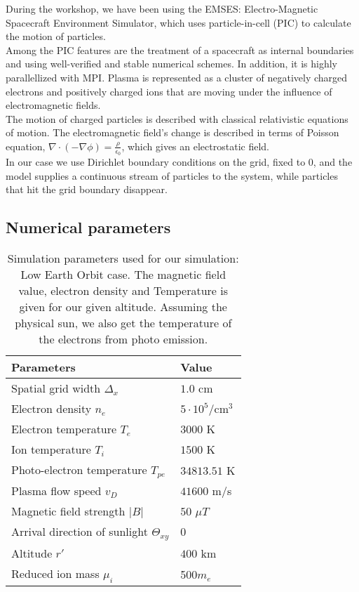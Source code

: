 \documentclass[aip, 
rsi, 
amsmath,
amssymb,
longbibliography,
preprint]{revtex4-1}
\begin{document}
During the workshop, we have been using the EMSES: Electro-Magnetic Spacecraft Environment Simulator, which uses particle-in-cell (PIC) to calculate the motion of particles.\\

Among the PIC features are the treatment of a spacecraft as internal boundaries and using well-verified and stable numerical schemes. In addition, it is highly parallellized with MPI. Plasma is represented as a cluster\cite{numsetup} of negatively charged electrons and positively charged ions that are moving under the influence of electromagnetic fields.\\

The motion of charged particles is described with classical relativistic equations of motion. The electromagnetic field’s change is described in terms of Poisson equation, $\nabla\cdot(-\nabla \phi)=\frac{\rho}{\epsilon_0}$, which gives an electrostatic field\cite{numsetup2}.\\

In our case we use Dirichlet boundary conditions on the grid, fixed to 0, and the model supplies a continuous stream of particles to the system, while particles that hit the grid boundary disappear.

\subsection{Numerical parameters}

\begin{table}
  \centering
  \caption{Simulation parameters used for our simulation: Low Earth Orbit case. The magnetic field value, electron density and Temperature is given for our given altitude. Assuming the physical sun, we also get the temperature of the electrons from photo emission.\label{tab:table1}}
\begin{tabular}{|l|l|}
\hline
\hline
  Parameters & Value  \\
  \hline
   Spatial grid width \(\Delta_x\) & \(1.0\) cm \\
   Electron density \(n_e\) & \(5 \cdot 10^5\)/cm$^3$   \\
   Electron temperature \(T_e\) & \(3000\) K   \\
   Ion temperature \(T_i\) & \(1500\) K \\
   Photo-electron temperature \(T_{pe}\) & \(34813.51\) K  \\
   Plasma flow speed \(v_D\)  & \(41600\) m/s  \\
   Magnetic field strength \(|B|\) & \(50 \)  \(\mu T\) \\
   Arrival direction of sunlight \(\Theta_{xy}\) & \(0\)\\
   Altitude \(r'\) & \(400\) km \\
   Reduced ion mass $\mu_i$ & 500$m_e$ \\
   \hline
\hline
\end{tabular}
\end{table}
\end{document}
